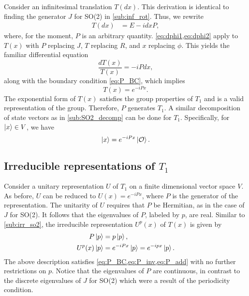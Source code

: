     Consider an infinitesimal translation $T(dx)$. This derivation is identical to finding the generator $J$ for SO(2) in \cref{sub:inf_rot}. Thus, we rewrite
    \begin{align*}
        T(dx) &= E - i dx P,
    \end{align*}
    where, for the moment, $P$ is an arbitrary quantity. \cref{eq:dphi1,eq:dphi2} apply to $T(x)$ with $P$ replacing $J$, $T$ replacing $R$, and $x$ replacing $\phi$. This yields the familiar differential equation
    \begin{equation}
        \frac{dT(x)}{T(x)} = -iP dx,
    \end{equation}
    along with the boundary condition \cref{eq:P_BC}, which implies
    \begin{equation}
        T(x) = e^{-iPx}.
    \end{equation}
    The exponential form of $T(x)$ satisfies the group properties of $T_1$ and is a valid representation of the group. Therefore, $P$ generates $T_1$. A similar decomposition of state vectors as in \cref{sub:SO2_decomp} can be done for $T_1$. Specifically, for $\ket{x}\in V$, we have
    \begin{align*}
        \ket{x} = e^{-iPx}\ket{\mathcal{O}}.
    \end{align*}

    \subsection{Irreducible representations of $T_1$}
    Consider a unitary representation $U$ of $T_1$ on a finite dimensional vector space $V$. As before, $U$ can be reduced to $U(x) = e^{-iPx}$, where $P$ is the generator of the representation. The unitarity of $U$ requires that $P$ be Hermitian, as in the case of $J$ for SO(2). It follows that the eigenvalues of $P$, labeled by $p$, are real. Similar to \cref{sub:irr_so2}, the irreducible representation $U^p(x)$ of $T(x)$ is given by
    \begin{align*}
        P\ket{p} &= p\ket{p}, \\
        U^p(x)\ket{p} &= e^{-iPx}\ket{p} = e^{-ip x}\ket{p}.
    \end{align*}
    The above description satisfies \cref{eq:P_BC,eq:P_inv,eq:P_add} with no further restrictions on $p$. Notice that the eigenvalues of $P$ are continuous, in contrast to the discrete eigenvalues of $J$ for SO(2) which were a result of the periodicity condition.




